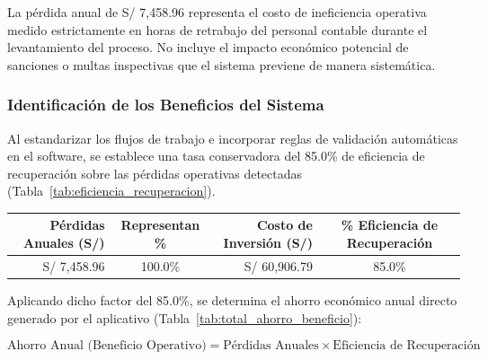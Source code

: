 La pérdida anual de S/ 7,458.96 representa el costo de ineficiencia operativa medido estrictamente en horas de 
retrabajo del personal contable durante el levantamiento del proceso. No incluye el impacto 
económico potencial de sanciones o multas inspectivas que el sistema previene de manera sistemática.

\clearpage
\subsubsection{Identificación de los Beneficios del Sistema}

Al estandarizar los flujos de trabajo e incorporar reglas de validación automáticas en el software, se establece una tasa conservadora 
del 85.0\% de eficiencia de recuperación sobre las pérdidas operativas detectadas (Tabla~\ref{tab:eficiencia_recuperacion}).

\par
\noindent
\begin{minipage}{\linewidth}

    \begingroup
    \renewcommand{\baselinestretch}{1}
    \footnotesize
    \setlength{\tabcolsep}{4pt}
    \renewcommand{\arraystretch}{1.25}

    \begin{tabularx}{\linewidth}{@{}r c r c@{}}
        \toprule
        \textbf{Pérdidas Anuales (S/)} & \textbf{Representan \%} & \textbf{Costo de Inversión (S/)} & \textbf{\% Eficiencia de Recuperación} \\ \midrule
        S/ 7,458.96 & 100.0\% & S/ 60,906.79 & 85.0\% \\ \bottomrule
    \end{tabularx}
    \endgroup

\end{minipage}
\finBloqueAPA

Aplicando dicho factor del 85.0\%, se determina el ahorro económico anual directo generado por el aplicativo (Tabla~\ref{tab:total_ahorro_beneficio}):

\begin{equation}
    \text{Ahorro Anual (Beneficio Operativo)} = \text{Pérdidas Anuales} \times \text{Eficiencia de Recuperación}
\end{equation}


